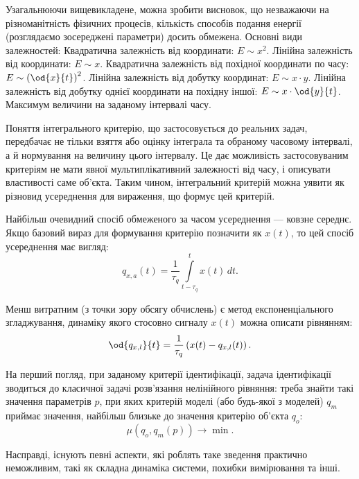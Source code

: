 \documentclass[a4paper,13pt]{atuaref}
\begin{document}
Узагальнюючи вищевикладене, можна зробити висновок, що незважаючи на
різноманітність фізичних процесів, кількість способів подання енергії
(розглядаємо зосереджені параметри) досить обмежена. Основні види залежностей:
  Квадратична залежність від координати:
    $E \sim x^2$.
  Лінійна залежність від координати:
    $E \sim x$.
  Квадратична залежність від похідної координати по часу:
    $E \sim \left( \od{x}{t}\right)^2$.
  Лінійна залежність від добутку координат:
    $E \sim x \cdot y$.
    Лінійна залежність від добутку однієї координати на похідну іншої:
     $E \sim x \cdot \od{y}{t}$.
  Максимум величини на заданому інтервалі часу.

Поняття інтегрального критерію, що застосовується до реальних задач, передбачає
не тільки взяття або оцінку інтеграла та обраному часовому
інтервалі, а й нормування на величину цього інтервалу. Це дає можливість
застосовуваним критеріям не мати явної мультиплікативний залежності від часу, і
описувати властивості саме об'єкта. Таким чином, інтегральний критерій можна
уявити як різновид усереднення для вираження, що формує цей критерій.

Найбільш очевидний спосіб обмеженого за часом усереднення --- ковзне середнє.
Якщо базовий вираз для формування критерію позначити як
$ x(t)$, то цей спосіб усереднення має вигляд:
%
\begin{equation}
  q_{x,a}(t) =
  \frac{1}{\tau_q}
  \int\limits_{t-\tau_q}^{t} x(t) \, dt.
  \label{atu:eq:moving_avarage}
\end{equation}

Менш витратним (з точки зору обсягу обчислень) є метод експоненціального
згладжування, динаміку якого стосовно сигналу $x(t) $ можна описати
рівнянням:
%
\begin{equation}
\od{q_{x,l}}{t}
=
\frac{1}{\tau_q} \left( x(t) - q_{x,l}(t) \right) .
\label{atu:eq:qlin}
\end{equation}

На перший погляд, при заданому критерії ідентифікації, задача ідентифікації
зводиться до класичної задачі розв'язання нелінійного рівняння: треба знайти
такі значення параметрів $ p $, при яких критерій моделі (або будь-якої з
моделей) $ q_m $ приймає значення, найбільш близьке до значення критерію
об'єкта $ q_o $:
\[
  \mu( q_o, q_m(p) ) \to \min.
\]

Насправді, існують певні аспекти, які роблять таке зведення практично
неможливим, такі як складна динаміка системи, похибки вимірювання та інші.

\end{document}
